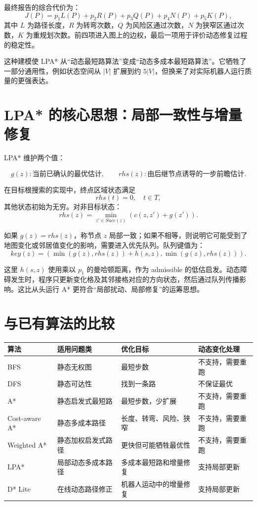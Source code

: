\documentclass[UTF8]{ctexart}
\begin{document}
最终报告的综合代价为：
\[
    J(P)
    =
    p_1 L(P)
    + p_2 R(P)
    + p_3 Q(P)
    + p_4 N(P)
    + p_5 K(P),
\]
其中 $L$ 为路径长度，$R$ 为转弯次数，$Q$ 为风险区通过次数，$N$ 为狭窄区通过次数，$K$ 为重规划次数。前四项进入图上的边权，最后一项用于评价动态修复过程的稳定性。

这种建模使 LPA* 从“动态最短路算法”变成“动态多成本最短路算法”。它牺牲了一部分通用性，例如状态空间从 $|V|$ 扩展到约 $5|V|$，但换来了对实际机器人运行质量的更强表达。

\section{LPA* 的核心思想：局部一致性与增量修复}

LPA* 维护两个值：

\[
    g(z): \text{当前已确认的最优估计}, \qquad
    rhs(z): \text{由后继节点诱导的一步前瞻估计}.
\]

在目标根搜索的实现中，终点区域状态满足
\[
    rhs(t)=0, \quad t\in T,
\]
其他状态初始为无穷。对非目标状态：
\[
    rhs(z)=\min_{z'\in Succ(z)} \left(c(z,z') + g(z')\right).
\]

如果 $g(z)=rhs(z)$，称节点 $z$ 局部一致；如果不相等，则说明它可能受到了地图变化或邻居值变化的影响，需要进入优先队列。队列键值为：
\[
    key(z)=
    \left(
    \min(g(z),rhs(z)) + h(s,z),
    \min(g(z),rhs(z))
    \right).
\]

这里 $h(s,z)$ 使用乘以 $p_1$ 的曼哈顿距离，作为 admissible 的低估启发。动态障碍发生时，程序只更新变化格及其邻接格对应的方向状态，然后通过队列传播影响。这比从头运行 A* 更符合“局部扰动、局部修复”的运筹思想。

\section{与已有算法的比较}

\begin{table}[h]
\centering
\begin{tabular}{llll}
\toprule
算法 & 适用问题类 & 优化目标 & 动态变化处理 \\
\midrule
BFS & 静态无权图 & 最短步数 & 不支持，需要重跑 \\
DFS & 静态可达性 & 找到一条路 & 不保证最优 \\
A* & 静态启发式最短路 & 最短步数，少扩展 & 不支持，需要重跑 \\
Cost-aware A* & 静态多成本路径 & 长度、转弯、风险、狭窄 & 不支持，需要重跑 \\
Weighted A* & 静态加权启发式路径 & 更快但可能牺牲最优性 & 不支持，需要重跑 \\
LPA* & 局部动态多成本路径 & 多成本最短路和增量修复 & 支持局部更新 \\
D* Lite & 在线动态路径修正 & 机器人运动中的增量修复 & 支持局部更新 \\
\bottomrule
\end{tabular}
\end{table}
\end{document}
